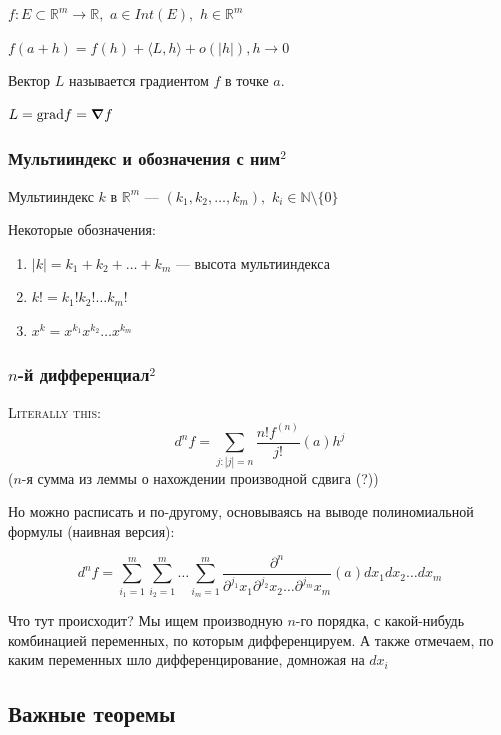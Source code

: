 \documentclass{article}
\def\dbl{\,\,}
\begin{document}
$f: E \subset \mathbb{R}^m \rightarrow \mathbb{R}, \dbl a \in Int(E), \dbl h \in \mathbb{R}^m$

$f(a + h) = f(h) + \langle L, h\rangle + o(|h|), h \rightarrow 0$

Вектор $L$ называется градиентом $f$ в точке $a$.

$L = \text{grad} f = \grad f$

\subsubsection{Мультииндекс и обозначения с ним\texorpdfstring{$^2$}{}}

Мультииндекс $k$ в $\mathbb{R}^m$ --- $(k_1, k_2, \ldots, k_m), \dbl k_i \in \mathbb{N} \setminus \{0\}$

Некоторые обозначения:

\begin{enumerate}
    \item $|k| = k_1 + k_2 + \ldots + k_m$ --- высота мультииндекса
    \item $k! = k_1!k_2!\ldots k_m!$
    \item $x^k = x^{k_1}x^{k_2}\ldots x^{k_m}$
\end{enumerate}

\subsubsection{\texorpdfstring{$n$}{n}-й дифференциал\texorpdfstring{$^2$}{}}

\textsc{Literally this: }
\[ d^n f = \sum_{j : |j| = n}{\frac{n! f^{(n)}}{j!}}(a)h^j \] ($n$-я сумма из леммы о нахождении производной сдвига (?))

Но можно расписать и по-другому, основываясь на выводе полиномиальной формулы (наивная версия):

\[d^n f = \sum_{i_1 = 1}^m \sum_{i_2 = 1}^m \dots \sum_{i_m = 1}^m \frac{\partial^n}{\partial^{j_1}{x_1}\partial^{j_2}{x_2}\ldots\partial^{j_m}{x_m}}(a)dx_1dx_2\ldots dx_m\]

Что тут происходит? Мы ищем производную $n$-го порядка, с какой-нибудь комбинацией переменных, по которым дифференцируем. А также отмечаем, по каким переменных шло дифференцирование, домножая на $dx_i$

\newpage
\subsection{Важные теоремы}
\end{document}
